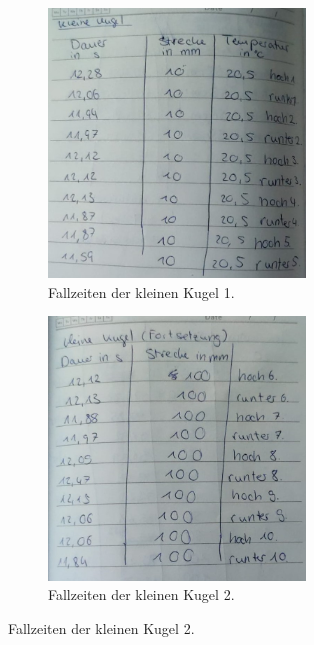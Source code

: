 \begin{figure}
  \centering
  \begin{subfigure}{0.5\textwidth}
    \centering
    \includegraphics[width=0.75\textwidth]{KleineKugel1.jpeg}
    \caption{Fallzeiten der kleinen Kugel 1.}
  \end{subfigure}

  \begin{subfigure}{0.5\textwidth}
    \centering
    \includegraphics[width=0.75\textwidth]{KleineKugel2.jpeg}
    \caption{Fallzeiten der kleinen Kugel 2.}
  \end{subfigure}


\end{figure}
